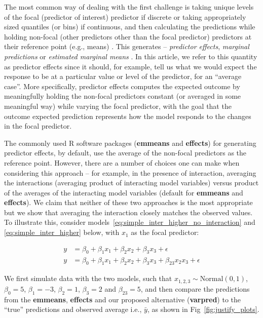 \documentclass[10pt,letterpaper]{article}
\newcommand{\pkg}[1]{\textbf{#1}}
\let\proglang=\textsf
\begin{document}
The most common way of dealing with the first challenge is taking unique levels of the focal (predictor of interest) predictor if discrete or taking appropriately sized quantiles (or bins) if continuous, and then calculating the predictions while holding non-focal (other predictors other than the focal predictor) predictors at their reference point (e.g., means) \cite{hanmer2013behind}. This generates -- \emph{predictor effects}\cite{fox2009effect}, \emph{marginal predictions} \cite{leeper2017package} or \emph{estimated marginal means} \cite{lenth2018package}. In this article, we refer to this quantity as predictor effects since it should, for example, tell us what we would expect the response to be at a particular value or level of the predictor, for an ``average case''. More specifically, predictor effects computes the expected outcome by meaningfully holding the non-focal predictors constant (or averaged in some meaningful way) while varying the focal predictor, with the goal that the outcome expected prediction represents how the model responds to the changes in the focal predictor.

The commonly used \proglang{R} software packages (\pkg{emmeans} and \pkg{effects}) for generating predictor effects, by default, use the average of the non-focal predictors as the reference point. However, there are a number of choices one can make when considering this approach -- for example, in the presence of interaction, averaging the interactions (averaging product of interacting model variables) versus product of the averages of the interacting model variables (default for \pkg{emmeans} and \pkg{effects}). We claim that neither of these two approaches is the most appropriate but we show that averaging the interaction closely matches the observed values. To illustrate this, consider models~\ref{eq:simple_inter_higher_no_interaction} and \ref{eq:simple_inter_higher} below, with $x_1$ as the focal predictor:

%
\begin{align}
y &= \beta_0 + \beta_1x_1 + \beta_2x_2 + \beta_3x_3 + \epsilon \label{eq:simple_inter_higher_no_interaction}\\
y &= \beta_0 + \beta_1x_1 + \beta_2x_2 + \beta_3x_3 + \beta_{23}x_2x_3 + \epsilon \label{eq:simple_inter_higher}
\end{align}
%

We first simulate data with the two models, such that $x_{1,2,3} \sim \mathrm{Normal}(0, 1)$, $\beta_0 = 5$, $\beta_1 = -3$, $\beta_2 = 1$, $\beta_3 = 2$ and $\beta_{23} = 5$, and then compare the predictions from the \pkg{emmeans}, \pkg{effects} and our proposed alternative (\pkg{varpred}) to the ``true'' predictions and observed average i.e., $\bar{y}$, as shown in Fig~\ref{fig:justify_plots}.
\end{document}
